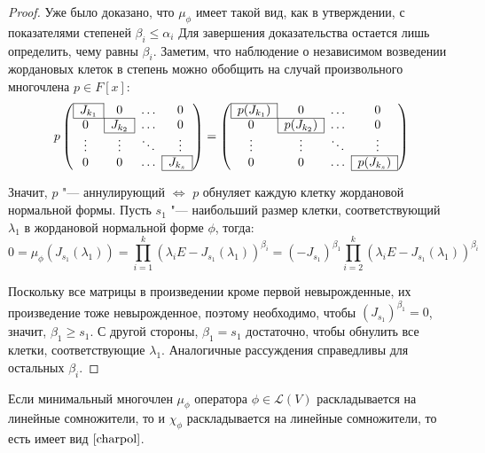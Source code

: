 \begin{proof}
	Уже было доказано, что $\mu_\phi$ имеет такой вид, как в утверждении, с показателями степеней $\beta_i \le \alpha_i$ Для завершения доказательства остается лишь определить, чему равны $\beta_i$. 	Заметим, что наблюдение о независимом возведении жордановых клеток в степень можно обобщить на случай произвольного многочлена $p \in F[x]$:
	\[p\left(\begin{array}{@{}cccc@{}}
		\cline{1-1}
		\multicolumn{1}{|c|}{J_{k_1}} & 0 & \dots & 0\\
		\cline{1-2}
		0 & \multicolumn{1}{|c|}{J_{k_2}} & \dots & 0\\
		\cline{2-2}
		\vdots & \vdots & \ddots & \vdots\\
		\cline{4-4}
		0 & 0 & \dots & \multicolumn{1}{|c|}{J_{k_s}}\\
		\cline{4-4}
	\end{array}\right) = \left(\begin{array}{@{}cccc@{}}
		\cline{1-1}
		\multicolumn{1}{|c|}{p(J_{k_1})} & 0 & \dots & 0\\
		\cline{1-2}
		0 & \multicolumn{1}{|c|}{p(J_{k_2})} & \dots & 0\\
		\cline{2-2}
		\vdots & \vdots & \ddots & \vdots\\
		\cline{4-4}
		0 & 0 & \dots & \multicolumn{1}{|c|}{p(J_{k_s})}\\
		\cline{4-4}
	\end{array}\right)\]
	
	Значит, $p$ "--- аннулирующий $\Leftrightarrow$ $p$ обнуляет каждую клетку жордановой нормальной формы. Пусть $s_1$ "--- наибольший размер клетки, соответствующий $\lambda_1$ в жордановой нормальной форме $\phi$, тогда:
	\[0 = \mu_\phi(J_{s_1}(\lambda_1)) = \prod_{i = 1}^k(\lambda_iE - J_{s_1}(\lambda_1))^{\beta_i} = (-J_{s_1})^{\beta_1}\prod_{i = 2}^k(\lambda_iE - J_{s_1}(\lambda_1))^{\beta_i}\]
	
	Поскольку все матрицы в произведении кроме первой невырожденные, их произведение тоже невырожденное, поэтому необходимо, чтобы $(J_{s_1})^{\beta_1} = 0$, значит, $\beta_1 \ge s_1$. С другой стороны, $\beta_1 = s_1$ достаточно, чтобы обнулить все клетки, соответствующие $\lambda_1$. Аналогичные рассуждения справедливы для остальных $\beta_i$.
\end{proof}

\begin{proposition}
	Если минимальный многочлен $\mu_\phi$ оператора $\phi \in \mathcal{L}(V)$ раскладывается на линейные сомножители, то и $\chi_\phi$ раскладывается на линейные сомножители, то есть имеет вид $\eqref*{charpol}$.
\end{proposition}

